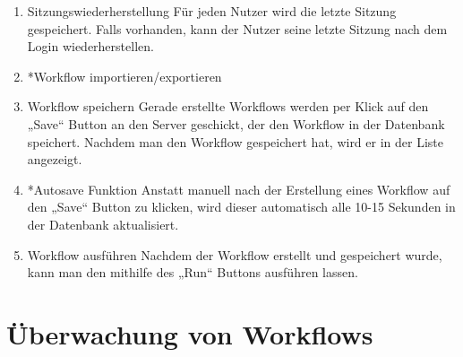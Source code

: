 \begin{enumerate}[font={\bfseries}, label={FA\arabic*}0, wide=0pt, labelindent=1em, leftmargin=*, resume]
            \item  \label{Sitzungswiederherstellung:1} Sitzungswiederherstellung \newline
            Für jeden Nutzer wird die letzte Sitzung gespeichert.\newline
            Falls vorhanden, kann der Nutzer seine letzte Sitzung nach dem Login wiederherstellen.
            
            \item \label{workflowImExport:1} *Workflow importieren/exportieren \newline 
            
            \item \label{workflowSpeichern:1} Workflow speichern \newline
             Gerade erstellte Workflows werden per Klick auf den „Save“ Button an den Server geschickt, der den Workflow in der Datenbank speichert. Nachdem man den Workflow gespeichert hat, wird er in der Liste angezeigt.
             
            \item   *Autosave Funktion \newline
            Anstatt manuell nach der Erstellung eines Workflow auf den „Save“ Button zu klicken, wird dieser automatisch alle 10-15 Sekunden in der Datenbank aktualisiert.
            
            \item \label{workflowAusfuehren:1} Workflow ausführen \newline
            Nachdem der Workflow erstellt und gespeichert wurde, kann man den mithilfe des „Run“ Buttons ausführen lassen.\
            
            \vspace{5cm}
            
        \end{enumerate} %
        
        \section{Überwachung von Workflows}
        
